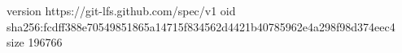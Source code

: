 version https://git-lfs.github.com/spec/v1
oid sha256:fcdff388e70549851865a14715f834562d4421b40785962e4a298f98d374eec4
size 196766
